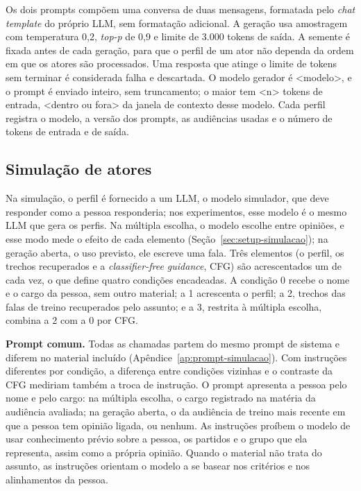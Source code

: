Os dois prompts compõem uma conversa de duas mensagens, formatada pelo \textit{chat template} do
próprio LLM, sem formatação adicional. A geração usa amostragem com temperatura 0,2, \textit{top-p}
de 0,9 e limite de 3.000 tokens de saída. A semente é fixada antes de cada geração, para que o perfil
de um ator não dependa da ordem em que os atores são processados. Uma resposta que atinge o limite de
tokens sem terminar é considerada falha e descartada. O modelo gerador é <modelo>, e o prompt é
enviado inteiro, sem truncamento; o maior tem <n> tokens de entrada, <dentro ou fora> da janela de
contexto desse modelo. Cada perfil registra o modelo, a versão dos prompts, as audiências usadas e o
número de tokens de entrada e de saída.


\subsection{Simulação de atores}
\label{sec:metodo-simulacao}

Na simulação, o perfil é fornecido a um LLM, o modelo simulador, que deve responder como a pessoa
responderia; nos experimentos, esse modelo é o mesmo LLM que gera os perfis. Na múltipla escolha, o
modelo escolhe entre opiniões, e esse modo mede o efeito de cada elemento
(Seção~\ref{sec:setup-simulacao}); na geração aberta, o uso previsto, ele escreve uma fala. Três
elementos (o perfil, os trechos recuperados e a \textit{classifier-free guidance}, CFG) são
acrescentados um de cada vez, o que define quatro condições encadeadas. A condição 0 recebe o nome e
o cargo da pessoa, sem outro material; a 1 acrescenta o perfil; a 2, trechos das falas de treino
recuperados pelo assunto; e a 3, restrita à múltipla escolha, combina a 2 com a 0 por CFG.

\textbf{Prompt comum.} Todas as chamadas partem do mesmo prompt de sistema e diferem no material
incluído (Apêndice~\ref{ap:prompt-simulacao}). Com instruções diferentes por condição, a diferença
entre condições vizinhas e o contraste da CFG mediriam também a troca de instrução. O prompt
apresenta a pessoa pelo nome e pelo cargo: na múltipla escolha, o cargo registrado na matéria da
audiência avaliada; na geração aberta, o da audiência de treino mais recente em que a pessoa tem
opinião ligada, ou nenhum. As instruções proíbem o modelo de usar conhecimento prévio sobre a
pessoa, os partidos e o grupo que ela representa, assim como a própria opinião. Quando o material não
trata do assunto, as instruções orientam o modelo a se basear nos critérios e nos alinhamentos da
pessoa.

